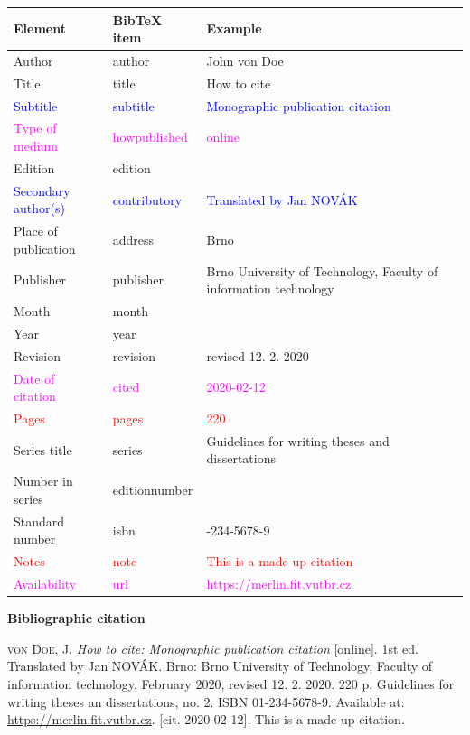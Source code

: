 \begin{tabularx}{0.95\linewidth}{>{\raggedright\arraybackslash}X X >{\raggedright\arraybackslash}X}
    Element & BibTeX item & Example\\\hline
    Author & author & John von Doe\\
    Title & title & How to cite\\
    \textcolor{blue}{Subtitle} & \textcolor{blue}{subtitle} & \textcolor{blue}{Monographic publication citation}\\
    \textcolor{magenta}{Type of medium} & \textcolor{magenta}{howpublished} & \textcolor{magenta}{online}\\
    Edition & edition & 1\\
    \textcolor{blue}{Secondary author(s)} & \textcolor{blue}{contributory} & \textcolor{blue}{Translated by Jan NOVÁK}\\
    Place of publication & address & Brno\\
    Publisher & publisher & Brno University of Technology, Faculty of information technology\\
    Month & month & 2\\
    Year & year & 2020\\
    Revision & revision & revised 12. 2. 2020\\
    \textcolor{magenta}{Date of citation} & \textcolor{magenta}{cited} & \textcolor{magenta}{2020-02-12}\\
    \textcolor{red}{Pages} & \textcolor{red}{pages} & \textcolor{red}{220}\\
    Series title & series & Guidelines for writing theses and dissertations\\
    Number in series & editionnumber & 2\\
    Standard number & isbn & 01-234-5678-9\\
    \textcolor{red}{Notes} & \textcolor{red}{note} & \textcolor{red}{This is a made up citation}\\
    \textcolor{magenta}{Availability} & \textcolor{magenta}{url} & \textcolor{magenta}{https://merlin.fit.vutbr.cz}\\
\end{tabularx}

\bigskip

\noindent \textbf{Bibliographic citation}

\medskip

\noindent \textsc{von Doe}, J. \textit{How to cite: Monographic publication citation} [online]. 1st ed. Translated by Jan NOVÁK.
Brno: Brno University of Technology, Faculty of information technology, February 2020, revised 12. 2. 2020.  220 p. Guidelines for writing theses an dissertations, no. 2. ISBN 01-234-5678-9. Available at: \url{https://merlin.fit.vutbr.cz}. [cit. 2020-02-12]. This is a made up citation.
\newpage
